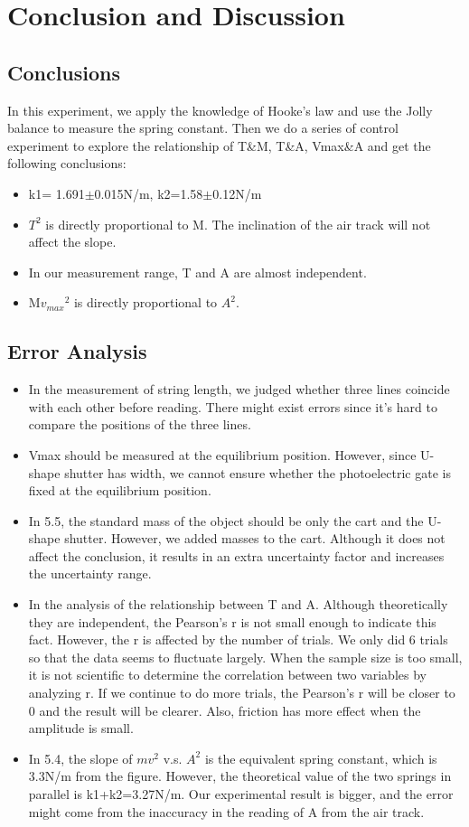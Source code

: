 \documentclass[12pt,a4paper]{article}
\begin{document}
\section{Conclusion and Discussion}

\subsection{Conclusions}
In this experiment, we apply the knowledge of Hooke’s law and use the Jolly balance to measure the spring constant. Then we do a series of control experiment to explore the relationship of T\&M, T\&A, Vmax\&A and get the following conclusions:
\begin{itemize}
    \item 	k1= 1.691$\pm$0.015N/m, k2=1.58$\pm$0.12N/m
    \item $T^2$ is directly proportional to M. The inclination of the air track will not affect the slope.
	\item In our measurement range, T and A are almost independent.
	\item M${v_{max}}^2$ is directly proportional to $A^2$.
\end{itemize}

\subsection{Error Analysis}
\begin{itemize}
    \item 	In the measurement of string length, we judged whether three lines coincide with each other before reading. There might exist errors since it’s hard to compare the positions of the three lines. 
    \item Vmax should be measured at the equilibrium position. However, since U-shape shutter has width, we cannot ensure whether the photoelectric gate is fixed at the equilibrium position.
	\item In 5.5, the standard mass of the object should be only the cart and the U-shape shutter. However, we added masses to the cart. Although it does not affect the conclusion, it results in an extra uncertainty factor and increases the uncertainty range.
	\item In the analysis of the relationship between T and A. Although theoretically they are independent, the Pearson’s r is not small enough to indicate this fact. However, the r is affected by the number of trials. We only did 6 trials so that the data seems to fluctuate largely. When the sample size is too small, it is not scientific to determine the correlation between two variables by analyzing r. If we continue to do more trials, the Pearson’s r will be closer to 0 and the result will be clearer. Also, friction has more effect when the amplitude is small. 
	\item In 5.4, the slope of $mv^2$ v.s. $A^2$ is the equivalent spring constant, which is 3.3N/m from the figure. However, the theoretical value of the two springs in parallel is k1+k2=3.27N/m. Our experimental result is bigger, and the error might come from the inaccuracy in the reading of A from the air track.
\end{itemize}
\end{document}
